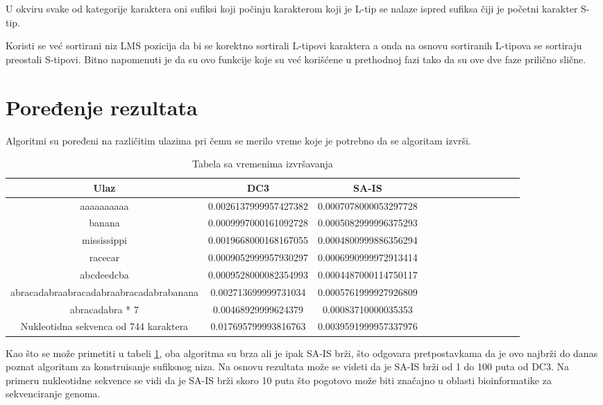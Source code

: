 \documentclass{article}
\begin{document}
U okviru svake od kategorije karaktera oni sufiksi koji počinju karakterom koji je L-tip se nalaze ispred sufiksa čiji je početni karakter S-tip.

Koristi se već sortirani niz LMS pozicija da bi se korektno sortirali L-tipovi karaktera a onda na osnovu sortiranih L-tipova se sortiraju preostali S-tipovi. Bitno napomenuti je da su ovo funkcije koje su već korišćene u prethodnoj fazi tako da su ove dve faze prilično slične.

\section{Poređenje rezultata}
Algoritmi su poređeni na različitim ulazima pri čemu se merilo vreme koje je potrebno da se algoritam izvrši.

\begin{table}[h!]
    \begin{center}
        \begin{tabular}{|c|c|c|c|c|c|c|c|c|c|c|c|c|} \hline
        Ulaz & DC3 & SA-IS\\ \hline
        aaaaaaaaaa & 0.0026137999957427382 & 0.0007078000053297728\\ \hline
        banana & 0.0009997000161092728 & 0.0005082999996375293\\ \hline
        mississippi & 0.0019668000168167055 & 0.0004800999886356294\\ \hline
        racecar & 0.0009052999957930297 & 0.0006990999972913414\\ \hline
        abcdeedcba & 0.0009528000082354993 & 0.0004487000114750117\\ \hline
        abracadabraabracadabraabracadabrabanana & 0.002713699999731034 & 0.0005761999927926809\\ \hline
        abracadabra * 7 & 0.00468929999624379 & 0.00083710000035353\\ \hline
        Nukleotidna sekvenca od 744 karaktera & 0.017695799993816763 & 0.0039591999957337976\\ \hline
        \end{tabular}
        \caption{Tabela sa vremenima izvršavanja}
        \label{table:3}
    \end{center}
\end{table}

Kao što se može primetiti u tabeli \ref{table:3}, oba algoritma su brza ali je ipak SA-IS brži, što odgovara pretpostavkama da je ovo najbrži do danas poznat algoritam za konstruisanje sufiksnog niza. Na osnovu rezultata može se videti da je SA-IS brži od 1 do 100 puta od DC3. Na primeru nukleotidne sekvence se vidi da je SA-IS brži skoro 10 puta što pogotovo može biti značajno u oblasti bioinformatike za sekvenciranje genoma.


 
\end{document}
